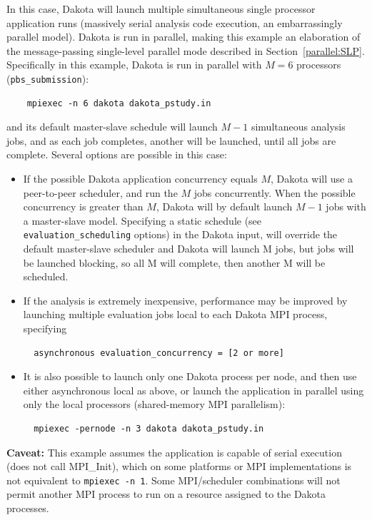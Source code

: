 In this case, Dakota will launch multiple simultaneous single
processor application runs (massively serial analysis code execution,
an embarrassingly parallel model).  Dakota is run in parallel, making
this example an elaboration of the message-passing single-level
parallel mode described in Section~\ref{parallel:SLP}.  Specifically
in this example, Dakota is run in parallel with $M=6$ processors
({\tt pbs\_submission}):
\begin{verbatim}
    mpiexec -n 6 dakota dakota_pstudy.in
\end{verbatim}
and its default master-slave schedule will launch $M-1$ simultaneous
analysis jobs, and as each job completes, another will be launched,
until all jobs are complete.  Several options are possible in this
case:
\begin{itemize}

\item If the possible Dakota application concurrency equals $M$,
Dakota will use a peer-to-peer scheduler, and run the $M$ jobs
concurrently.  When the possible concurrency is greater than $M$,
Dakota will by default launch $M-1$ jobs with a master-slave model.
Specifying a static schedule (see {\tt evaluation\_scheduling} 
options) in the Dakota input, will override the default master-slave 
scheduler and Dakota will launch M jobs, but jobs will be launched 
blocking, so all M will complete, then another M will be scheduled.

\item If the analysis is extremely inexpensive, performance may be
improved by launching multiple evaluation jobs local to each Dakota
MPI process, specifying
\begin{verbatim}
  asynchronous evaluation_concurrency = [2 or more]
\end{verbatim}

\item It is also possible to launch only one Dakota process per node,
and then use either asynchronous local as above, or launch the
application in parallel using only the local processors (shared-memory
MPI parallelism):

\begin{verbatim}
  mpiexec -pernode -n 3 dakota dakota_pstudy.in
\end{verbatim}

\end{itemize}

{\bf Caveat:} This example assumes the application is capable of
serial execution (does not call MPI\_Init), which on some platforms or
MPI implementations is not equivalent to {\tt mpiexec -n 1}.  Some
MPI/scheduler combinations will not permit another MPI process to run
on a resource assigned to the Dakota processes.


